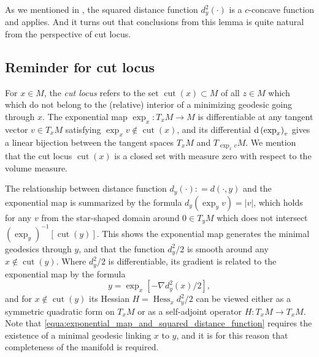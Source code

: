 As we mentioned in ,
the squared distance function $d^2_y(\cdot)$ is a $c$-concave function and  applies.
And it turns out that conclusions from this lemma is quite natural from the perspective of cut locus.

\subsection{Reminder for cut locus}

For \( x \in M \), the \emph{cut locus} refers to the set \( \operatorname{cut}( x ) \subset M \) of all \( z \in M \) which
which do not belong to the (relative) interior of a minimizing geodesic going
through $x$.
The exponential map \( \exp _ { x } : T _ { x } M \rightarrow M \) is differentiable
at any tangent vector \( v \in T _ { x } M \) satisfying \( \exp _ { x } v \notin \operatorname{cut}( x )\),
and its differential \( \operatorname{d} \left( \exp _ { x } \right) _ { v } \) gives a linear bijection between the tangent
spaces \( T _ { x } M \) and \( T _ { \exp _ { x } v} M\).
We mention that the cut locus $\operatorname{cut} (x)$ is a closed set with measure zero with respect to the volume measure.

The relationship between distance function $d_y(\cdot) : = d(\cdot, y) $ and the
exponential map is summarized by the formula \( d _ { y } \left( \exp _ { y } v \right) = | v | \),
which holds for any \( v \) from the star-shaped domain around \( 0 \in T _ { y } M \)
which does not intersect \( \left( \exp _ { y } \right) ^ { - 1 } [ \operatorname{cut} ( y ) ]\).
This shows the exponential map generates the minimal geodesics through \( y \),
and that the function \( d _ { y } ^ { 2 } / 2 \) is smooth around any \( x \notin \operatorname{cut} ( y ) \).
Where \( d _ { y } ^ { 2 } / 2 \) is differentiable,
its gradient is related to the exponential map by the formula
\begin{equation}
	\label{equa:exponential_map_and_squared_distance_function}
	y = \exp _ { x } \left[ - \nabla d _ { y } ^ { 2 } ( x ) / 2 \right],
\end{equation}
and for \( x \notin \operatorname { cut } ( y ) \) its Hessian \( H = \operatorname{ Hess} _ { x } d _ { y } ^ { 2 } / 2 \) can be viewed either as a symmetric quadratic form on \( T _ { x } M \) or as a self-adjoint operator
\( H : T _ { x } M \rightarrow T _ { x } M \).
Note that \cref{equa:exponential_map_and_squared_distance_function} requires the existence of
a minimal geodesic linking \( x \) to \( y \),
and it is for this reason that completeness of the manifold is required.

